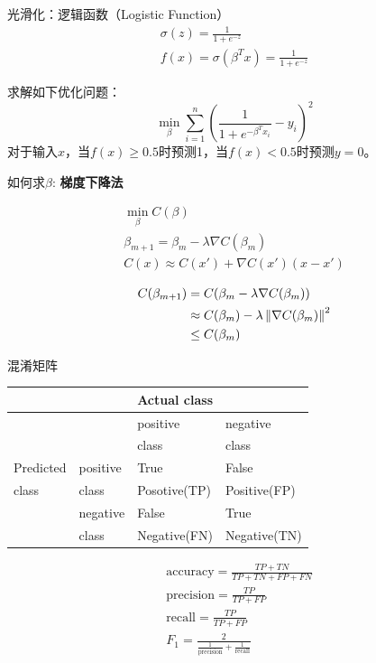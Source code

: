 \documentclass[11pt]{article}
\begin{document}
光滑化：逻辑函数（Logistic Function）
\begin{gather*}
\sigma(z)=\frac{1}{1+e^{-z}}\\
f(x)=\sigma(\beta^Tx)=\frac{1}{1+e^{-z}}
\end{gather*}

求解如下优化问题：
\begin{equation*}
\min_\beta\sum_{i=1}^n\left( \frac{1}{1+e^{-\beta^Tx_i}}-y_i \right)^2
\end{equation*}
对于输入\(x\)，当\(f(x)\ge 0.5\)时预测1，当\(f(x)<0.5\)时预测\(y=0\)。

如何求\(\beta\): \textbf{梯度下降法}

\begin{gather*}
\min_\beta C(\beta)\\
\beta_{m+1}=\beta_m-\lambda\nabla C(\beta_m)\\
C(x)\approx C(x')+\nabla C(x')(x-x')\\
\end{gather*}
\begin{align*}
C(\beta_{m+1})&=C(\beta_m-\lambda\nabla C(\beta_m))\\
&\approx C(\beta_m)-\lambda\left\lVert\nabla C(\beta_m)\right\rVert^2\\
&\le C(\beta_m)
\end{align*}

混淆矩阵
\begin{center}
\begin{tabular}{|l|l|l|l|}
\hline
 & & \multicolumn{2}{l|}{Actual class} \\
\hline
 & & positive & negative \\
 & & class & class \\
\hline
Predicted & positive & True & False \\
class & class & Posotive(TP) & Positive(FP) \\
\cline{2-4}
 & negative & False & True \\
 & class & Negative(FN) & Negative(TN) \\
\hline
\end{tabular}
\end{center}

\begin{align*}
&\text{accuracy}=\frac{TP+TN}{TP+TN+FP+FN}\\
&\text{precision}=\frac{TP}{TP+FP}\\
&\text{recall}=\frac{TP}{TP+FP}\\
&F_1=\frac{2}{\frac{1}{\text{precision}}+\frac{1}{\text{recall}}}
\end{align*}
\end{document}
